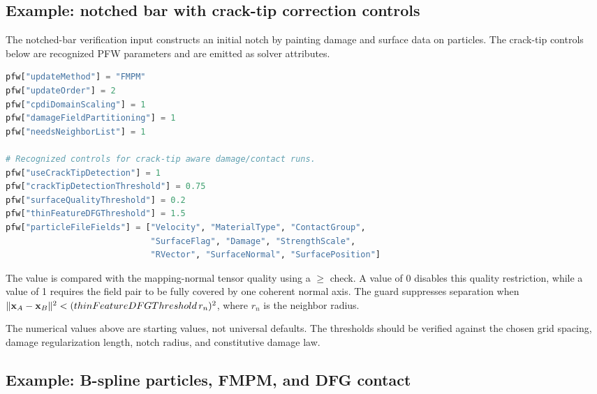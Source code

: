 \subsection{Example: notched bar with crack-tip correction controls}

The notched-bar verification input constructs an initial notch by painting damage and surface data on particles. The crack-tip controls below are recognized PFW parameters and are emitted as solver attributes.

\begin{lstlisting}[language=Python,caption={Notched-bar crack-tip and DFG controls.}]
pfw["updateMethod"] = "FMPM"
pfw["updateOrder"] = 2
pfw["cpdiDomainScaling"] = 1
pfw["damageFieldPartitioning"] = 1
pfw["needsNeighborList"] = 1

# Recognized controls for crack-tip aware damage/contact runs.
pfw["useCrackTipDetection"] = 1
pfw["crackTipDetectionThreshold"] = 0.75
pfw["surfaceQualityThreshold"] = 0.2
pfw["thinFeatureDFGThreshold"] = 1.5
pfw["particleFileFields"] = ["Velocity", "MaterialType", "ContactGroup",
                             "SurfaceFlag", "Damage", "StrengthScale",
                             "RVector", "SurfaceNormal", "SurfacePosition"]
\end{lstlisting}

The  value is compared with the mapping-normal tensor quality using a \(\ge\) check.  A value of 0 disables this quality restriction, while a value of 1 requires the field pair to be fully covered by one coherent normal axis.  The  guard suppresses separation when \(\|\mathbf{x}_A-\mathbf{x}_B\|^2 < (thinFeatureDFGThreshold\,r_n)^2\), where \(r_n\) is the neighbor radius.

The numerical values above are starting values, not universal defaults.  The thresholds should be verified against the chosen grid spacing, damage regularization length, notch radius, and constitutive damage law.

\subsection{Example: B-spline particles, FMPM, and DFG contact}

